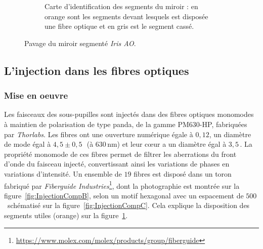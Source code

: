 \begin{figure}[ht!]
\begin{subfigure}[t]{0.5\textwidth}
        \caption{Carte d'identification des segments du miroir : en orange sont les segments devant lesquels est disposée une fibre optique et en gris est le segment cassé.}
        \label{fig:IrisAOMapB}
    \end{subfigure}
    \caption[Pavage du miroir segmenté \textit{Iris AO}.]{Pavage du miroir segmenté \textit{Iris AO}.}
    \label{fig:IrisAOMap}
\end{figure}


\subsection{L'injection dans les fibres optiques}
\label{sec:FiberInjection}

\subsubsection{Mise en oeuvre}

Les faisceaux des sous-pupilles sont injectés dans des fibres optiques monomodes à maintien de polarisation de type panda, de la gamme PM630-HP, fabriquées par \textit{Thorlabs}. Les fibres ont une ouverture numérique égale à $0,12$, un diamètre de mode égal à $4,5 \pm 0,5 \,$\um~(à $630 \,$nm) et leur cœur a un diamètre égal à $3,5 \,$\um. La propriété monomode de ces fibres permet de filtrer les aberrations du front d'onde du faisceau injecté, convertissant ainsi les variations de phases en variations d'intensité. Un ensemble de $19$ fibres est disposé dans un toron fabriqué par \textit{Fiberguide Industries}\footnote{\url{https://www.molex.com/molex/products/group/fiberguide}}, dont la photographie est montrée sur la figure~\ref{fig:InjectionCompB}, selon un motif hexagonal avec un espacement de $500 \,$\um~schématisé sur la figure~\ref{fig:InjectionCompC}. Cela explique la disposition des segments utiles (orange) sur la figure~\ref{fig:IrisAOMapB}.

